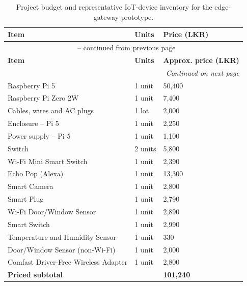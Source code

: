 {\small
\begin{longtable}{|p{}|p{}|p{}|}
\caption{Project budget and representative IoT-device inventory for the edge-gateway prototype.}
\label{tb:budget}\\
\hline
\textbf{Item} & \textbf{Units} & \textbf{Price (LKR)} \\
\hline
\endfirsthead
\multicolumn{3}{c}{\tablename\ \thetable{} -- continued from previous page}\\
\hline
\textbf{Item} & \textbf{Units} & \textbf{Approx. price (LKR)} \\
\hline
\endhead
\hline \multicolumn{3}{r}{\textit{Continued on next page}}\\
\endfoot
\hline
\endlastfoot
Raspberry Pi 5 & 1 unit & 50{,}400 \\
\hline
Raspberry Pi Zero 2W & 1 unit & 7{,}400 \\
\hline
Cables, wires and AC plugs & 1 lot & 2{,}000 \\
\hline
Enclosure -- Pi 5 & 1 unit & 2{,}250 \\
\hline
Power supply -- Pi 5 & 1 unit & 1{,}100 \\
\hline
Switch & 2 units & 5{,}800 \\
\hline
Wi-Fi Mini Smart Switch & 1 unit & 2{,}390 \\
\hline
Echo Pop (Alexa) & 1 unit & 13{,}300 \\
\hline
Smart Camera & 1 unit & 2{,}800 \\
\hline
Smart Plug & 1 unit & 2{,}790 \\
\hline
Wi-Fi Door/Window Sensor & 1 unit & 2{,}890 \\
\hline
Smart Switch & 1 unit & 2{,}990 \\
\hline
Temperature and Humidity Sensor & 1 unit & 330 \\
\hline
Door/Window Sensor (non-Wi-Fi) & 1 unit & 2{,}000 \\
\hline
Comfast Driver-Free Wireless Adapter & 1 unit & 2{,}800 \\
\hline

\multicolumn{2}{|l|}{\textbf{Priced subtotal }} & \textbf{101{,}240} \\
\hline
\end{longtable}
}

